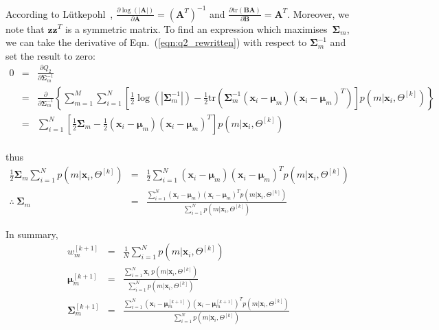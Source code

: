 \documentclass[10pt,a4paper]{article}
\def\Vec#1{{\boldsymbol{#1}}}
\def\Mat#1{{\boldsymbol{#1}}}
\begin{document}
\noindent
According to L\"{u}tkepohl~\cite{Lutkepohl96},
$\frac{\partial \log(|\Mat{A}|)}{\partial \Mat{A}} = (\Mat{A}^{T})^{-1}$
and $\frac{\partial \mbox{tr}(\Mat{B}\Mat{A})}{\partial \Mat{B}} = \Mat{A}^T$.
Moreover, we note that $\Vec{z}\Vec{z}^T$ is a symmetric matrix.
To find an expression which maximises~$\Mat{\Sigma}_m$,
we can take the derivative of Eqn.~(\ref{eqn:q2_rewritten}) with respect to $\Mat{\Sigma}_m^{-1}$
and set the result to zero:
%
\begin{eqnarray}
	0 & = & \frac{\partial Q_2}{\partial \Mat{\Sigma}_m^{-1}}  \\
	~ & = & \frac{\partial}{\partial  \Mat{\Sigma}_m^{-1}} \left\{
		\sum\nolimits_{m=1}^{M} \sum\nolimits_{i=1}^{N} \left[
					\frac{1}{2} \log(|\Mat{\Sigma}_m^{-1}|) - \frac{1}{2} \mbox{tr}\left(\Mat{\Sigma}_m^{-1} (\Vec{x}_i - \Vec{\mu}_m) (\Vec{x}_i - \Vec{\mu}_m)^T \right)
					\right] p(m|\Vec{x}_i, \Theta^{[k]})
	\right\} \\
	~ & = & \sum\nolimits_{i=1}^{N} \left[ \frac{1}{2} \Mat{\Sigma}_m - \frac{1}{2} (\Vec{x}_i - \Vec{\mu}_m) (\Vec{x}_i - \Vec{\mu}_m)^T \right] p(m|\Vec{x}_i, \Theta^{[k]}) \\
\end{eqnarray}%

\noindent
thus
%
\begin{eqnarray}
	\frac{1}{2} \Mat{\Sigma}_m \sum\nolimits_{i=1}^{N} p(m|\Vec{x}_i, \Theta^{[k]}) & = & \frac{1}{2} \sum\nolimits_{i=1}^{N} 
																		(\Vec{x}_i - \Vec{\mu}_m) (\Vec{x}_i - \Vec{\mu}_m)^T p(m|\Vec{x}_i, \Theta^{[k]}) \\
	\therefore ~ \Mat{\Sigma}_m & = & \frac{\sum\nolimits_{i=1}^{N} (\Vec{x}_i - \Vec{\mu}_m) (\Vec{x}_i - \Vec{\mu}_m)^T p(m|\Vec{x}_i, \Theta^{[k]})}
						{\sum\nolimits_{i=1}^{N} p(m|\Vec{x}_i, \Theta^{[k]})}
\end{eqnarray}

\noindent
In summary,
%
\begin{eqnarray}
	w_m^{[k+1]}	& = & \frac{1}{N} \sum\nolimits_{i=1}^{N} p(m|\Vec{x}_i, \Theta^{[k]})  \label{eqn:copy_of_solved_alpha}  \\  
	\Vec{\mu}_m^{[k+1]} & = & \frac{ \sum\nolimits_{i=1}^{N} \Vec{x}_i ~ p(m|\Vec{x}_i, \Theta^{[k]}) }
								   { \sum\nolimits_{i=1}^{N} p(m|\Vec{x}_i, \Theta^{[k]}) }  \label{eqn:copy_of_solved_mu} \\
	\Mat{\Sigma}_m^{[k+1]}	& = & \frac{\sum\nolimits_{i=1}^{N} (\Vec{x}_i - \Vec{\mu}_m^{[k+1]}) (\Vec{x}_i - \Vec{\mu}_m^{[k+1]})^T p(m|\Vec{x}_i, \Theta^{[k]})}
						{\sum\nolimits_{i=1}^{N} p(m|\Vec{x}_i, \Theta^{[k]})}  \label{eqn:copy_of_solved_sigma}
\end{eqnarray}
\end{document}
